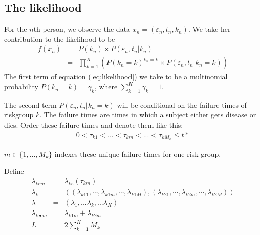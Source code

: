 \documentclass[11pt]{article}
\begin{document}
\subsection{The likelihood}
For the $n$th person, we observe the data $x_n = (\varepsilon_n, t_n,
k_n)$.  We take her contribution to the likelihood to be
\begin{eqnarray}
f(x_n) & = & P(k_n) \times P(\varepsilon_n, t_n | k_n) \label{eq:likelihood} \\
          & = & \prod_{k=1}^K \left( P(k_n = k)^{k_n = k} \times P(\varepsilon_n, t_n |
  k_n = k) \right)
\end{eqnarray}
The first term of equation (\ref{eq:likelihood}) we take to be a 
multinomial probability $P(k_n = k) =
\gamma_k$, where $\sum_{k=1}^K \gamma_k = 1$.  

The second term $P(\varepsilon_n, t_n | k_n = k)$
will be conditional on the failure times of riskgroup $k$.  The
failure times are times in which a subject either gets disease or dies.
Order these failure times and denote them like this:
\begin{eqnarray}
0<\tau_{k1} < ...< \tau_{km} < ... < \tau_{kM_k}\le t*
\end{eqnarray}

$m \in \{1, ..., M_k\}$ indexes these unique failure times for one risk
group. 

Define
\begin{eqnarray}
\lambda_{kem} & = & \lambda_{ke}(\tau_{km})\\
\lambda_{k} & = &
              ((\lambda_{k11}, \cdots, \lambda_{k1m}, \cdots, \lambda_{k1M}),
               (\lambda_{k21}, \cdots, \lambda_{k2m}, \cdots, \lambda_{k2M}))
                  \\
\lambda & = & (\lambda_{1},...\lambda_{k}, ...\lambda_{K}) \\
\lambda_{k \bullet m} & = & \lambda_{k1m} + \lambda_{k2m} \\
L & = & 2 \sum_{k=1}^K{M_k}
\end{eqnarray}
\end{document}
